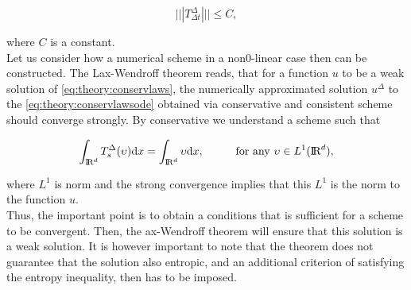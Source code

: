 \documentclass[11pt,a4paper,headinclude=true,DIV=14,BCOR=8mm,chapterprefix,listof=totoc,twoside,openright,abstracton]{scrbook}
\begin{document}
\begin{equation}
    |||T^{\Delta}_{\Delta t}||| \leq C,
\end{equation}

where $C$ is a constant. \\

Let us consider how a numerical scheme in a non0-linear case then can be constructed. The Lax-Wendroff theorem \cite{Lax:1960} reads, that for a function $u$ to be a weak solution of \ref{eq:theory:conservlaws}, the numerically approximated solution $u^{\Delta}$ to the \ref{eq:theory:conservlawsode} obtained via conservative and consistent scheme should converge strongly. By conservative we understand a scheme such that 

\begin{equation}
    \int_{\text{I\!R}^d} T^{\Delta}_s(\upsilon)\text{d}x = \int_{\text{I\!R}^d}\upsilon\text{d}x, \hspace{10mm} \text{for any } \upsilon\in L^1(\text{I\!R}^d),
\end{equation}

where $L^1$ is norm and the strong convergence implies that this $L^1$ is the norm to the function $u$. \\

Thus, the important point is to obtain a conditions that is sufficient for a scheme to be convergent. Then, the ax-Wendroff theorem will ensure that this solution is a weak solution. It is however important to note that the theorem does not guarantee that the solution also entropic, and an additional criterion of satisfying the entropy inequality, then has to be imposed. \\
\end{document}

